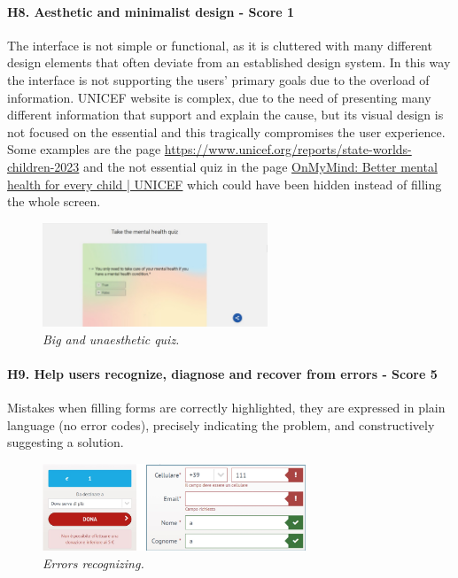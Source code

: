 \newline
\newline \paragraph{H8. Aesthetic and minimalist design - Score 1} \label{subsec:H8}	The interface is not simple or functional, as it is cluttered with many different design elements that often deviate from an established design system. In this way the interface is not supporting the users’ primary goals due to the overload of information.
\newline UNICEF website is complex, due to the need of presenting many different information that support and explain the cause, but its visual design is not focused on the essential and this tragically compromises the user experience.
\newline Some examples are the page \href{https://www.unicef.org/reports/state-worlds-children-2023}{https://www.unicef.org/reports/state-worlds-children-2023} and the not essential quiz in the page \href{https://www.unicef.org/on-my-mind}{OnMyMind: Better mental health for every child | UNICEF} which could have been hidden instead of filling the whole screen. 
\begin{figure}[!h]
	\begin{center}
		\includegraphics[width=0.6\textwidth]{FinalScores14.jpg}
		\captionsetup{font=small}
		\caption{\textit{Big and unaesthetic quiz.}}
	\end{center}
\end{figure}
\newline
\newline \paragraph{H9. Help users recognize, diagnose and recover from errors - Score 5} \label{subsec:H9}	Mistakes when filling forms are correctly highlighted, they are expressed in plain language (no error codes), precisely indicating the problem, and constructively suggesting a solution.
\begin{figure}[!h]
	\begin{center}
		\includegraphics[width=0.7\textwidth]{FinalScores15.jpg}
		\captionsetup{font=small}
		\caption{\textit{Errors recognizing.}}
	\end{center}
\end{figure}

